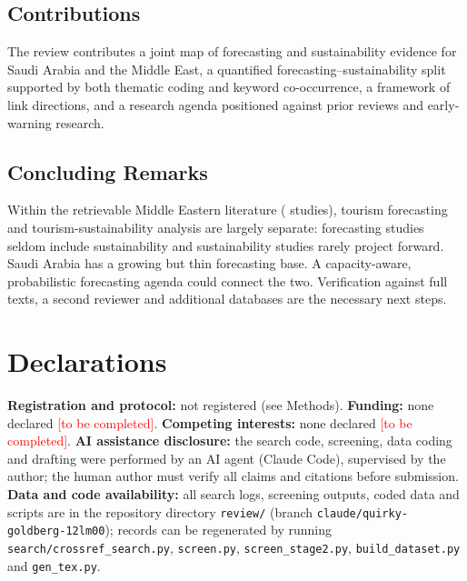 \documentclass[11pt,a4paper]{article}
\newcommand{\tbd}{\textcolor{red}{[to be completed]}}
\begin{document}
\subsection{Contributions}
The review contributes a joint map of forecasting and sustainability evidence for Saudi Arabia and the Middle East, a quantified forecasting--sustainability split supported by both thematic coding and keyword co-occurrence, a framework of link directions, and a research agenda positioned against prior reviews and early-warning research.

\subsection{Concluding Remarks}

Within the retrievable Middle Eastern literature (\Nincluded{} studies), tourism forecasting and tourism-sustainability analysis are largely separate: forecasting studies seldom include sustainability and sustainability studies rarely project forward. Saudi Arabia has a growing but thin forecasting base. A capacity-aware, probabilistic forecasting agenda could connect the two. Verification against full texts, a second reviewer and additional databases are the necessary next steps.

\section*{Declarations}
\noindent\textbf{Registration and protocol:} not registered (see Methods). \textbf{Funding:} none declared \tbd. \textbf{Competing interests:} none declared \tbd. \textbf{AI assistance disclosure:} the search code, screening, data coding and drafting were performed by an AI agent (Claude Code), supervised by the author; the human author must verify all claims and citations before submission. \textbf{Data and code availability:} all search logs, screening outputs, coded data and scripts are in the repository directory \texttt{review/} (branch \texttt{claude/quirky-goldberg-12lm00}); records can be regenerated by running \texttt{search/crossref\_search.py}, \texttt{screen.py}, \texttt{screen\_stage2.py}, \texttt{build\_dataset.py} and \texttt{gen\_tex.py}.




\appendix
\end{document}
